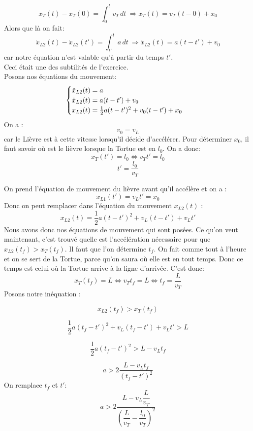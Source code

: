 \documentclass[a4paper,10pt,twoside]{article}
\begin{document}
\[ x_T(t)-x_T(0)= \int_{0}^{t} v_T \, dt\ \Rightarrow  x_T(t) = v_T (t-0) + x_0 \]
Alors que là on fait:
\[ \dot{x}_{L2} (t) - \dot{x}_{L2} (t')  =\int_{t'}^{t} a \, dt\ \Rightarrow \dot{x}_{L2} (t)  = a(t-t')+v_0\]
car notre équation n'est valable qu'à partir du temps $t'$. \\
Ceci était une des subtilités de l'exercice.\\
Posons nos équations du mouvement:
\begin{equation}
    \centering
    \begin{cases}
         \ddot{x}_{L2}(t)=a \\
         \dot{x}_{L2}(t)=a(t-t')+v_0 \\
         x_{L2}(t)=\frac{1}{2}a(t-t')^2+v_0(t-t')+x_0
    \end{cases}
\end{equation}
On a :
\[v_0=v_L\] car le Lièvre est à cette vitesse lorsqu'il décide d'accélérer. Pour déterminer $x_0$, il faut savoir où est le lièvre lorsque la Tortue est en $l_0$.  On a donc:
\[x_T (t')=l_0 \iff v_T t'=l_0 \]
\[ t'=\dfrac{l_0}{v_T}\] 

On prend l'équation de mouvement du lièvre avant qu'il accélère et on a :
\[ x_{L1} (t')=v_L t'=x_0\] 
Donc on peut remplacer dans l'équation du mouvement $x_{L2}(t)$ : 
\[ x_{L2}(t)=\frac{1}{2}a(t-t')^2+v_L(t-t')+ v_L t'\]
Nous avons donc nos équations de mouvement qui sont posées. Ce qu'on veut maintenant, c'est trouvé quelle est l'accélération nécessaire pour que $x_{L2}(t_f)>x_T(t_f)$.
Il faut que l'on détermine $t_f$. On fait comme tout à l'heure et on se sert de la Tortue, parce qu'on saura où elle est en tout temps. Donc ce temps est celui où la Tortue arrive à la ligne d'arrivée. C'est donc: 
\[x_T(t_f)=L \iff v_T t_f=L \iff t_f=\dfrac{L}{v_T} \]
Posons notre inéquation :

\[x_{L2}(t_f)>x_T(t_f) \]

\[\frac{1}{2} a(t_f-t')^2+v_L (t_f-t')+ v_L t'>L\]

\[\frac{1}{2} a(t_f-t')^2>L-v_L t_f\]

\[ a>2 \dfrac{L-v_L t_f}{(t_f-t')^2}\]
On remplace $t_f$ et $t'$:
\[ a>2 \dfrac{L-v_L \dfrac{L}{v_T}}{\left(\dfrac{L}{v_T}-\dfrac{l_0}{v_T}\right)^2}\]
\end{document}
